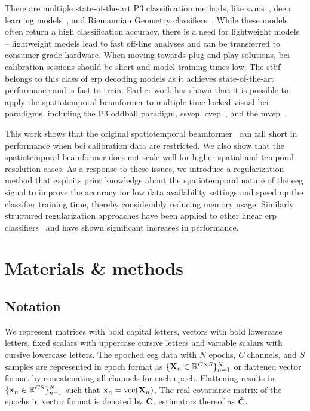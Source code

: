  There are multiple state-of-the-art P3 classification methods, like
  \acp{svm}~\cite{Tayeb2014}, deep
	learning models~\cite{Vareka2020,Borra2020}, and Riemannian Geometry
	classifiers~\cite{Barachant2014}.
	While these models often return a high classification accuracy, there is a need
	for lightweight models -- lightweight models lead to fast off-line analyses and can be transferred to consumer-grade hardware.
	When moving towards plug-and-play solutions, \ac{bci} calibration sessions should be short and model training times low.
  The \ac{stbf}~\cite{VanVliet2015, Wittevrongel2016} belongs to
	this class of \ac{erp} decoding models as it achieves state-of-the-art performance and is fast to train.
	Earlier work has shown that it is
	possible to apply the spatiotemporal beamformer to multiple time-locked visual
  \ac{bci} paradigms, including the P3 oddball paradigm, \ac{ssvep},
  \ac{cvep}~\cite{Wittevrongel2017a}, and the \ac{mvep}~\cite{Libert2021}.

	This work shows that the original spatiotemporal
	beamformer~\cite{Wittevrongel2016} can fall short in performance when \ac{bci}
	calibration data are restricted.
	We also show that the spatiotemporal beamformer does not scale well for
	higher spatial and temporal resolution cases.
	As a response to these issues, we introduce a regularization method that
	exploits prior knowledge about the spatiotemporal nature of the \ac{eeg} signal to
	improve the accuracy for low data availability settings and speed up the
	classifier training time, thereby considerably reducing memory usage.
	Similarly structured regularization approaches have been applied to other linear
	\ac{erp} classifiers~\cite{GonzalezNavarro2017, Vliet2020} and have shown
	significant increases in performance.

	\section{Materials \& methods}
	\subsection{Notation}
	We represent matrices with bold capital letters, vectors with bold
	lowercase letters, fixed scalars with uppercase cursive letters and variable
  scalars with cursive lowercase letters.
	The epoched \ac{eeg} data with $N$ epochs, $C$ channels, and $S$ samples are
  represented in epoch format as $\{\mathbf{X}_n\in\mathbb{R}^{C\times S}\}^N_{n=1}$
  or flattened vector format by concatenating all channels for each epoch.
	Flattening results in $\{\mathbf{x}_n\in\mathbb{R}^{CS}\}^N_{n=1}$ such that
  $\mathbf{x}_n = \operatorname{vec}(\mathbf{X}_n)$.
	The real covariance matrix of the epochs in vector format is
  denoted by $\mathbf{C}$, estimators thereof as $\hat{\mathbf{C}}$.


